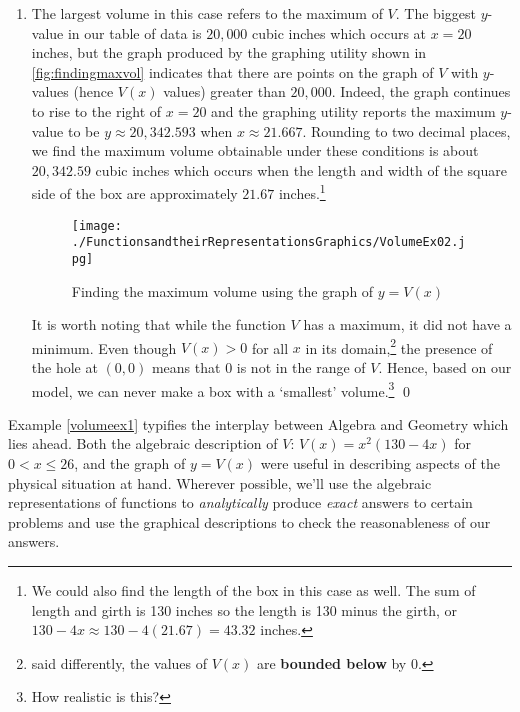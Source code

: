 \begin{ex}
\begin{enumerate}
\item  The largest volume in this case refers to the maximum of $V$.  The biggest $y$-value in our table of data is $20, \! 000$ cubic inches which occurs at $x = 20$ inches, but the graph produced by the graphing utility shown in \autoref{fig:findingmaxvol} indicates that there are points on the graph of $V$ with $y$-values (hence $V(x)$ values) greater than $20, \! 000$.  Indeed, the graph continues to rise to the right of $x = 20$ and the graphing utility reports the maximum $y$-value to be $y \approx 20, \! 342.593$ when $x \approx 21.667$.  Rounding to two decimal places, we find the maximum volume obtainable under these conditions is about $20, \! 342.59$ cubic inches which occurs when the length and width of the square side of the box are approximately $21.67$ inches.\footnote{We could also find the length of the box in this case as well.  The sum of length and girth is 130 inches so the length is 130 minus the girth, or $130 - 4x \approx 130 - 4(21.67) = 43.32$ inches.}  

\begin{figure}
\begin{center}

\texttt{[image: ./FunctionsandtheirRepresentationsGraphics/VolumeEx02.jpg]} 

\caption{Finding the maximum volume using the graph of $y = V(x)$}
\label{fig:findingmaxvol}
\end{center}
\end{figure}

It is worth noting that while the function $V$ has a maximum, it did not have a minimum.  Even though $V(x)>0$ for all $x$ in its domain,\footnote{said differently, the values of $V(x)$ are \textbf{bounded below} by $0$.} the presence of the hole at $(0,0)$ means that $0$ is not in the range of $V$.  Hence, based on our model, we can never make a box with a  `smallest' volume.\footnote{How realistic is this?}  \qed

\end{enumerate}
\end{ex}

Example \ref{volumeex1} typifies the interplay between Algebra and Geometry which lies ahead.  Both the algebraic description of  $V$: $V(x) = x^2 (130 - 4x)$ for $0 < x \leq 26$, and the graph of $y=V(x)$ were useful in describing aspects of the physical situation at hand.  Wherever possible, we'll use the algebraic representations of functions to \textit{analytically} produce \textit{exact} answers to certain problems and use the graphical descriptions to check the reasonableness of our answers. 


